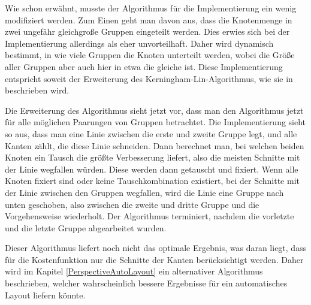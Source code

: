 Wie schon erwähnt, musste der Algorithmus für die Implementierung ein wenig
modifiziert werden. Zum Einen geht man davon aus, dass die
Knotenmenge in zwei ungefähr gleichgroße Gruppen eingeteilt werden. Dies erwies
sich bei der Implementierung allerdings als eher unvorteilhaft. Daher wird dynamisch
bestimmt, in wie viele Gruppen die Knoten unterteilt werden, wobei die Größe
aller Gruppen aber auch hier in etwa die gleiche ist. Diese
Implementierung entspricht soweit der Erweiterung des
Kerningham-Lin-Algorithmus, wie sie in \cite{Layout} beschrieben
wird.\vspace{10pt}

Die Erweiterung des Algorithmus sieht jetzt vor, dass man den Algorithmus jetzt
für alle möglichen Paarungen von Gruppen betrachtet. Die Implementierung
sieht so aus, dass man eine Linie zwischen die erste und zweite Gruppe legt, und
alle Kanten zählt, die diese Linie schneiden. Dann berechnet man, bei
welchen beiden Knoten ein Tausch die größte Verbesserung liefert, also die
meisten Schnitte mit der Linie wegfallen würden. Diese werden dann getauscht und
fixiert. Wenn alle Knoten fixiert sind oder keine Tauschkombination existiert,
bei der Schnitte mit der Linie zwischen den Gruppen wegfallen, wird die Linie
eine Gruppe nach unten geschoben, also zwischen die zweite und dritte Gruppe und
die Vorgehensweise wiederholt. Der Algorithmus terminiert, nachdem die vorletzte
und die letzte Gruppe abgearbeitet wurden.\vspace{10pt}

Dieser Algorithmus liefert noch nicht das optimale Ergebnis, was daran liegt,
dass für die Kostenfunktion nur die Schnitte der Kanten berücksichtigt werden.
Daher wird im Kapitel \ref{PerspectiveAutoLayout} ein alternativer Algorithmus beschrieben,
welcher wahrscheinlich bessere Ergebnisse für ein automatisches Layout liefern
könnte.\vspace{10pt}

